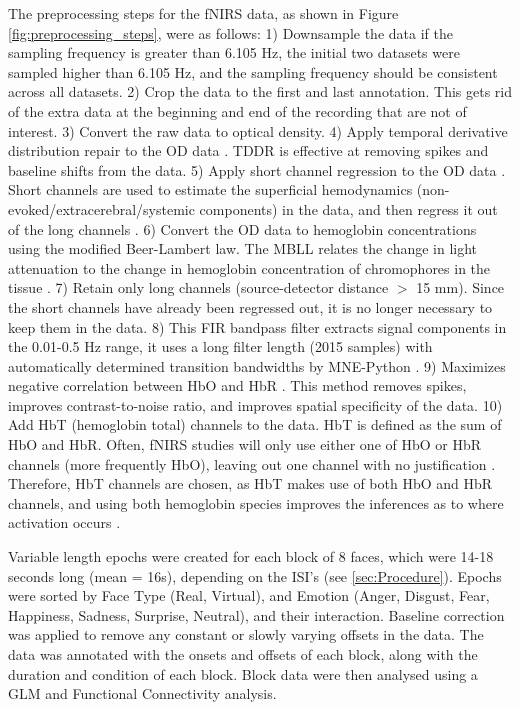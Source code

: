 The preprocessing steps for the fNIRS data, as shown in Figure \ref{fig:preprocessing_steps}, were as follows:
1) Downsample the data if the sampling frequency is greater than 6.105 Hz, the initial two datasets were sampled higher than 6.105 Hz, and the sampling frequency should be consistent across all datasets.
2) Crop the data to the first and last annotation. This gets rid of the extra data at the beginning and end of the recording that are not of interest.
3) Convert the raw data to optical density.
4) Apply temporal derivative distribution repair to the OD data \citep{fishburn_temporal_2019}. TDDR is effective at removing spikes and baseline shifts from the data. 
5) Apply short channel regression to the OD data \citep{scholkmann_measuring_2014}. Short channels are used to estimate the superficial hemodynamics (non-evoked/extracerebral/systemic components) in the data, and then regress it out of the long channels \citep{tachtsidis_false_2016}. 
6) Convert the OD data to hemoglobin concentrations using the modified Beer-Lambert law. The MBLL relates the change in light attenuation to the change in hemoglobin concentration of chromophores in the tissue \citep{kocsis_modified_2006}.
7) Retain only long channels (source-detector distance $>$ 15 mm). Since the short channels have already been regressed out, it is no longer necessary to keep them in the data.
8) This FIR bandpass filter extracts signal components in the 0.01-0.5 Hz range, it uses a long filter length (2015 samples) with automatically determined transition bandwidths by MNE-Python \citep{pinti_current_2019}. 
9) Maximizes negative correlation between HbO and HbR \citep{cui_functional_2010}. This method removes spikes, improves contrast-to-noise ratio, and improves spatial specificity of the data.
10) Add HbT (hemoglobin total) channels to the data. HbT is defined as the sum of HbO and HbR. Often, fNIRS studies will only use either one of HbO or HbR channels (more frequently HbO), leaving out one channel with no justification \citep{kinder_systematic_2022}. Therefore, HbT channels are chosen, as HbT makes use of both HbO and HbR channels, and using both hemoglobin species improves the inferences as to where activation occurs \cite{hocke_automated_2018}.

Variable length epochs were created for each block of 8 faces, which were 14-18 seconds long (mean = 16s), depending on the ISI's (see \ref{sec:Procedure}).
Epochs were sorted by Face Type (Real, Virtual), and Emotion (Anger, Disgust, Fear, Happiness, Sadness, Surprise, Neutral), and their interaction.
Baseline correction was applied to remove any constant or slowly varying offsets in the data. 
The data was annotated with the onsets and offsets of each block, along with the duration and condition of each block. 
Block data were then analysed using a GLM and Functional Connectivity analysis. 

